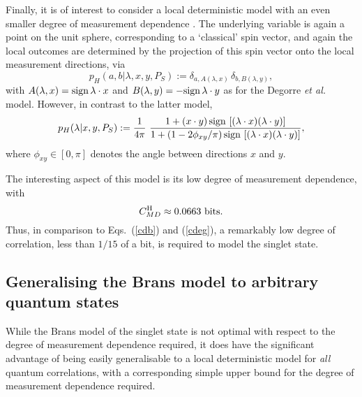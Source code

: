 \documentclass[graybox]{svmult}
\begin{document}
Finally, it is of interest to consider a local deterministic model with an even smaller degree of measurement dependence \cite{hallmodel}.  The underlying variable is again a point on the unit sphere, corresponding to a `classical' spin vector, and again the local outcomes are determined by the projection of this spin vector onto the local measurement directions, via
\begin{equation}
p_H(a,b|\lambda,x,y,P_S) :=\delta_{a,A(\lambda,x)} \, \delta_{b,B(\lambda,y)} ,
\end{equation}
with  $A(\lambda,x)={\rm sign}\,\lambda\cdot x$ and $B(\lambda,y)=-{\rm sign}\,\lambda\cdot y$  as for the Degorre {\it et al.} model.
However, in contrast to the latter model,
\begin{equation}
p_H(\lambda|x,y,P_S) := \frac{1}{4\pi} ~ \frac{1+(x\cdot y) \,{\rm sign}\,\left[(\lambda\cdot x)(\lambda\cdot y)\right] }{1 +(1-2\phi_{xy}/\pi)\,{\rm sign}\,\left[(\lambda\cdot x)(\lambda\cdot y)\right] },
\end{equation}
where $\phi_{xy}\in[0,\pi]$ denotes the angle between directions $x$ and $y$.

The interesting aspect of this model is its low degree of measurement dependence, with \cite{relaxed}
\begin{equation}
C^{\rm H}_{MD} \approx 0.0663~{\rm bits}.
\end{equation}
Thus, in comparison to Eqs.~(\ref{cdb}) and (\ref{cdeg}), a remarkably low degree of correlation, less than $1/15$ of a bit, is required to model the singlet state.  


\subsection{Generalising the Brans model to arbitrary quantum states}
\label{4.3}

While the Brans model of the singlet state is not optimal with respect to the degree of measurement dependence required, it does have the significant advantage of being easily generalisable to a local deterministic model for {\it all} quantum correlations, with a corresponding simple upper bound for the degree of measurement dependence required.


\end{document}
